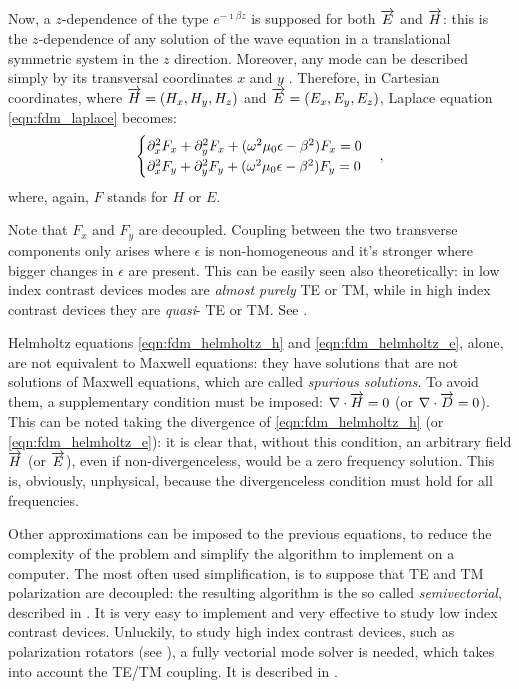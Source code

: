 Now, a $z$-dependence of the type $e^{-\imath \beta z}$ is supposed
for both $\overrightarrow{E}$ and $\overrightarrow{H}$: this is the $z$-dependence of any solution of
the wave equation in a translational symmetric system in the $z$
direction. Moreover, any mode can be described simply by its
transversal coordinates $x$ and $y$
\cite{someda_electromagnetic}. Therefore, in Cartesian coordinates,
where $\overrightarrow{H} = \left( H_x,H_y,H_z \right)$ and $\overrightarrow{E} = \left( E_x,E_y,E_z
\right)$, Laplace equation \eqref{eqn:fdm_laplace} becomes:
\begin{equation} \label{eqn:fdm_laplace_cartesian} \begin{cases}
    \partial_x^2 F_x + \partial_y^2 F_x + (\omega^2 \mu_0 \epsilon - \beta^2) F_x = 0 \\
    \partial_x^2 F_y + \partial_y^2 F_y + (\omega^2 \mu_0 \epsilon - \beta^2) F_y = 0
\end{cases} , \end{equation}
where, again, $F$ stands for $H$ or $E$.

Note that $F_x$ and $F_y$ are decoupled. Coupling between the two
transverse components only arises where $\epsilon$ is non-homogeneous
and it's stronger where bigger changes in $\epsilon$ are present. This
can be easily seen also theoretically: in low index contrast devices
modes are \emph{almost purely} TE or TM, while in high index contrast
devices they are \emph{quasi}- TE or TM. See .

Helmholtz equations \eqref{eqn:fdm_helmholtz_h} and
\eqref{eqn:fdm_helmholtz_e}, alone, are not equivalent to Maxwell
equations: they have solutions that are not solutions of Maxwell
equations, which are called \emph{spurious solutions}. To avoid them,
a supplementary condition must be imposed: ${\nabla \cdot \overrightarrow{H}} = 0$ (or
${\nabla \cdot \overrightarrow{D}} = 0$). This can be noted taking the divergence of
\eqref{eqn:fdm_helmholtz_h} (or \eqref{eqn:fdm_helmholtz_e}): it is
clear that, without this condition, an arbitrary field $\overrightarrow{H}$ (or $\overrightarrow{E}$),
even if non-divergenceless, would be a zero frequency solution. This is,
obviously, unphysical, because the divergenceless condition must hold
for all frequencies.

Other approximations can be imposed to the previous equations, to
reduce the complexity of the problem and simplify the algorithm to
implement on a computer. The most often used simplification, is to
suppose that TE and TM polarization are decoupled: the resulting
algorithm is the so called \emph{semivectorial}, described in
. It is very easy to implement
and very effective to study low index contrast devices. Unluckily, to
study high index contrast devices, such as polarization rotators (see
), a fully vectorial mode solver is needed, which
takes into account the TE/TM coupling. It is described in
.

